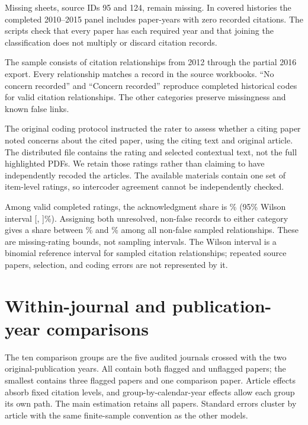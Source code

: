 \documentclass[11pt,letterpaper]{article}
\begin{document}
Missing sheets, source IDs 95 and 124, remain missing. In covered histories the completed 2010--2015 panel includes \ZeroYears{} paper-years with zero recorded citations. The scripts check that every paper has each required year and that joining the classification does not multiply or discard citation records.

\begin{table}[htbp]
\centering
\caption{Disposition of the historical citation-context sample}
\label{tab:coding}

\par\smallskip
\begin{minipage}{.95\linewidth}\footnotesize
The sample consists of citation relationships from 2012 through the partial 2016 export. Every relationship matches a record in the source workbooks. ``No concern recorded'' and ``Concern recorded'' reproduce completed historical codes for valid citation relationships. The other categories preserve missingness and known false links.
\end{minipage}
\end{table}

The original coding protocol instructed the rater to assess whether a citing paper noted concerns about the cited paper, using the citing text and original article. The distributed file contains the rating and selected contextual text, not the full highlighted PDFs. We retain those ratings rather than claiming to have independently recoded the articles. The available materials contain one set of item-level ratings, so intercoder agreement cannot be independently checked.


Among valid completed ratings, the acknowledgment share is \AckPercent\% (95\% Wilson interval [\AckLower, \AckUpper]\%). Assigning both unresolved, non-false records to either category gives a share between \AckBoundLower\% and \AckBoundUpper\% among all non-false sampled relationships. These are missing-rating bounds, not sampling intervals. The Wilson interval is a binomial reference interval for sampled citation relationships; repeated source papers, selection, and coding errors are not represented by it.

\section{Within-journal and publication-year comparisons}\label{app:journalcohort}
The ten comparison groups are the five audited journals crossed with the two original-publication years. All contain both flagged and unflagged papers; the smallest contains three flagged papers and one comparison paper. Article effects absorb fixed citation levels, and group-by-calendar-year effects allow each group its own path. The main estimation retains all \Analyzed{} papers. Standard errors cluster by article with the same finite-sample convention as the other models.
\end{document}
